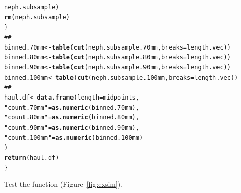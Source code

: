\documentclass[12pt]{article}\usepackage[]{graphicx}\usepackage[]{color}
\makeatletter
\newcommand{\hlstr}[1]{\textcolor[rgb]{0.192,0.494,0.8}{#1}}%
\newcommand{\hlcom}[1]{\textcolor[rgb]{0.678,0.584,0.686}{\textit{#1}}}%
\newcommand{\hlstd}[1]{\textcolor[rgb]{0.345,0.345,0.345}{#1}}%
\newcommand{\hlkwb}[1]{\textcolor[rgb]{0.69,0.353,0.396}{#1}}%
\newcommand{\hlkwc}[1]{\textcolor[rgb]{0.333,0.667,0.333}{#1}}%
\newcommand{\hlkwd}[1]{\textcolor[rgb]{0.737,0.353,0.396}{\textbf{#1}}}%
\newenvironment{kframe}{%
 \def\at@end@of@kframe{}%
 \ifinner\ifhmode%
  \def\at@end@of@kframe{\end{minipage}}%
  \begin{minipage}{\columnwidth}%
 \fi\fi%
 \def\FrameCommand##1{\hskip\@totalleftmargin \hskip-\fboxsep
 \colorbox{shadecolor}{##1}\hskip-\fboxsep
     \hskip-\linewidth \hskip-\@totalleftmargin \hskip\columnwidth}%
 \MakeFramed {\advance\hsize-\width
   \@totalleftmargin\z@ \linewidth\hsize
   \@setminipage}}%
 {\par\unskip\endMakeFramed%
 \at@end@of@kframe}
\newenvironment{knitrout}{}{} %
\makeatother
\begin{document}
\begin{knitrout}
\begin{kframe}
\begin{alltt}
           \hlstd{neph.subsample)}
    \hlkwd{rm}\hlstd{(neph.subsample)}
  \hlstd{\}}
  \hlcom{##}
  \hlstd{binned.70mm} \hlkwb{<-} \hlkwd{table}\hlstd{(}\hlkwd{cut}\hlstd{(neph.subsample.70mm,} \hlkwc{breaks} \hlstd{= length.vec))}
  \hlstd{binned.80mm} \hlkwb{<-} \hlkwd{table}\hlstd{(}\hlkwd{cut}\hlstd{(neph.subsample.80mm,} \hlkwc{breaks} \hlstd{= length.vec))}
  \hlstd{binned.90mm} \hlkwb{<-} \hlkwd{table}\hlstd{(}\hlkwd{cut}\hlstd{(neph.subsample.90mm,} \hlkwc{breaks} \hlstd{= length.vec))}
  \hlstd{binned.100mm} \hlkwb{<-} \hlkwd{table}\hlstd{(}\hlkwd{cut}\hlstd{(neph.subsample.100mm,} \hlkwc{breaks} \hlstd{= length.vec))}
  \hlcom{##}
  \hlstd{haul.df} \hlkwb{<-} \hlkwd{data.frame}\hlstd{(}\hlkwc{length} \hlstd{= midpoints,}
                        \hlstr{"count.70mm"} \hlstd{=} \hlkwd{as.numeric}\hlstd{(binned.70mm),}
                        \hlstr{"count.80mm"} \hlstd{=} \hlkwd{as.numeric}\hlstd{(binned.80mm),}
                        \hlstr{"count.90mm"} \hlstd{=} \hlkwd{as.numeric}\hlstd{(binned.90mm),}
                        \hlstr{"count.100mm"} \hlstd{=} \hlkwd{as.numeric}\hlstd{(binned.100mm)}
                        \hlstd{)}
  \hlkwd{return}\hlstd{(haul.df)}
\hlstd{\}}
\end{alltt}
\end{kframe}
\end{knitrout}

Test the function (Figure~\ref{fig:exsim}).
\end{document}
